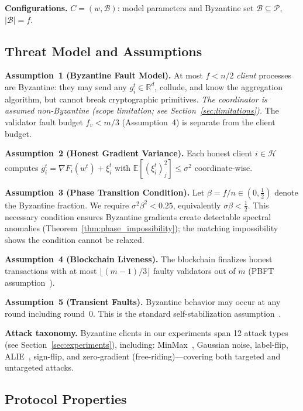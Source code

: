 \smallskip\noindent\textbf{Configurations.} $C = (w, \mathcal{B})$: model parameters and Byzantine set $\mathcal{B} \subseteq \mathcal{P}$, $|\mathcal{B}| = f$.

\subsection{Threat Model and Assumptions}
\label{sec:threat_model}

\noindent\textbf{Assumption~1 (Byzantine Fault Model).}
At most $f < n/2$ \emph{client} processes are Byzantine: they may send any $g_i^t \in \mathbb{R}^d$,
collude, and know the aggregation algorithm, but cannot break cryptographic primitives.
\emph{The coordinator is assumed non-Byzantine (scope limitation; see Section~\ref{sec:limitations}).}
The validator fault budget $f_v < m/3$ (Assumption~4) is separate from the client budget.

\noindent\textbf{Assumption~2 (Honest Gradient Variance).}
Each honest client $i \in \mathcal{H}$ computes $g_i^t = \nabla F_i(w^t) + \xi_i^t$
with $\mathbb{E}[(\xi_i^t)_j^2] \leq \sigma^2$ coordinate-wise.

\noindent\textbf{Assumption~3 (Phase Transition Condition).}
Let $\beta = f/n \in (0, \tfrac{1}{2})$ denote the Byzantine fraction.
We require $\sigma^2\beta^2 < 0.25$, equivalently $\sigma\beta < \tfrac{1}{2}$.
This necessary condition ensures Byzantine gradients create
detectable spectral anomalies (Theorem~\ref{thm:phase_impossibility});
the matching impossibility shows the condition cannot be relaxed.

\noindent\textbf{Assumption~4 (Blockchain Liveness).}
The blockchain finalizes honest transactions with at most $\lfloor(m-1)/3\rfloor$ faulty
validators out of $m$ (PBFT assumption~\cite{bft_consensus}).

\noindent\textbf{Assumption~5 (Transient Faults).}
Byzantine behavior may occur at any round including round~0.
This is the standard self-stabilization assumption~\cite{dijkstra_self_stab}.

\smallskip\noindent\textbf{Attack taxonomy.}
Byzantine clients in our experiments span 12 attack types (see Section~\ref{sec:experiments}),
including: MinMax~\cite{fl_poisoning}, Gaussian noise, label-flip, ALIE~\cite{alie_attack},
sign-flip, and zero-gradient (free-riding)---covering both targeted and untargeted attacks.

\subsection{Protocol Properties}
\label{sec:properties}

